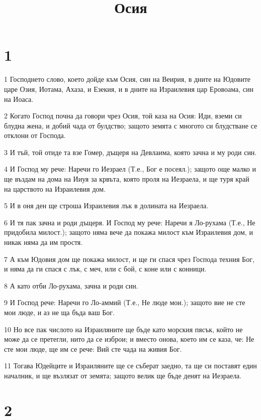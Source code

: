 

\title{Осия}


\chapter{1}

\par 1 Господнето слово, което дойде към Осия, син на Веирия, в дните на Юдовите царе Озия, Иотама, Ахаза, и Езекия, и в дните на Израилевия цар Еровоама, син на Иоаса.
\par 2 Когато Господ почна да говори чрез Осия, той каза на Осия: Иди, вземи си блудна жена, и добий чада от булдство; защото земята с многото си блудстване се отклони от Господа.
\par 3 И тъй, той отиде та взе Гомер, дъщеря на Девлаима, която зачна и му роди син.
\par 4 И Господ му рече: Наречи го Иезраел (Т.е., Бог е посеял.); защото още малко и ще въздам на дома на Ииуя за крвъта, която проля на Иезраела, и ще туря край на царството на Израилевия дом.
\par 5 И в оня ден ще строша Израилевия лък в долината на Иезраела.
\par 6 И тя пак зачна и роди дъщеря. И Господ  му рече: Наречи я Ло-рухама (Т.е., Не придобила милост.); защото няма вече да покажа милост към Израилевия дом, и никак няма да им простя.
\par 7 А към Юдовия дом ще покажа милост, и ще ги спася чрез Господа техния Бог, и няма да ги спася с лък, с меч, или с бой, с коне или с конници.
\par 8 А като отби Ло-рухама, зачна и роди син.
\par 9 И Господ рече: Наречи го Ло-аммий (Т.е., Не люде мои.); защото вие не сте мои люде, и аз не ща бъда ваш Бог.
\par 10 Но все пак числото на Израиляните ще бъде като морския пясък, който не може да се претегли, нито да се изброи; и вместо онова, което им се каза, че: Не сте мои люде, ще им се рече: Вий сте чада на живия Бог.
\par 11 Тогава Юдейците и Израиляните ще се съберат заедно, та ще си поставят един началник, и ще възлязат от земята; защото велик ще бъде денят на Иезраела.

\chapter{2}

